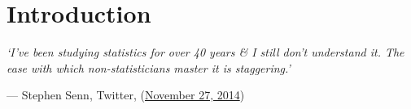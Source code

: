 \chapter{Introduction}
\epigraph{\centering \textit{`I've been studying statistics for over 40 years \& I still don't understand it. The ease with which non-statisticians master it is staggering.'}}{--- Stephen Senn, Twitter, (\href{https://twitter.com/stephensenn/status/538017638111531009}{November 27, 2014})}

